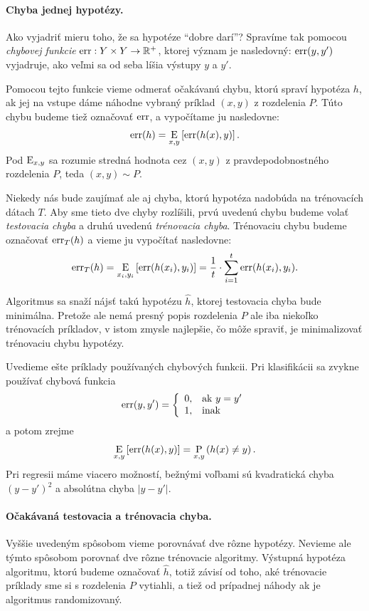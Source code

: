 \paragraph{Chyba jednej hypotézy.}
Ako vyjadriť mieru toho, že sa hypotéze ``dobre darí''? Spravíme tak
pomocou \emph{chybovej funkcie} $\mathrm{err} : Y \times Y \to \mathbb{R}^+$,
ktorej význam je nasledovný: $\mathrm{err}(y, y')$ vyjadruje, ako veľmi
sa od seba líšia výstupy $y$ a $y'$.

Pomocou tejto funkcie vieme odmerať očakávanú chybu, ktorú spraví
hypotéza $h$, ak jej na vstupe dáme náhodne vybraný príklad $(x, y)$
z rozdelenia $P$. Túto chybu budeme tiež označovať $\mathrm{err}$, a vypočítame
ju nasledovne:
$$\mathrm{err}(h) = \operatorname*{\mathrm{E}}_{x, y} \left[ \mathrm{err}(h(x), y) \right].$$
Pod $\operatorname*{\mathrm{E}}_{x, y}$ sa rozumie stredná hodnota cez $(x, y)$
z pravdepodobnostného rozdelenia $P$, teda $(x, y) \sim P$.

Niekedy nás bude zaujímať ale aj chyba, ktorú hypotéza nadobúda na
trénovacích dátach $T$. Aby sme tieto dve chyby rozlíšili, prvú uvedenú
chybu budeme volať \emph{testovacia chyba} a druhú uvedenú
\emph{trénovacia chyba}. Trénovaciu chybu budeme označovať $\mathrm{err}_T(h)$
a vieme ju vypočítať nasledovne:
$$\mathrm{err}_T(h) = \operatorname*{\mathrm{E}}_{x_i, y_i} \left[ \mathrm{err}(h(x_i), y_i) \right] = \frac{1}{t} \cdot \sum_{i=1}^t \mathrm{err}(h(x_i), y_i).$$

Algoritmus sa snaží nájsť takú hypotézu $\hat{h}$, ktorej testovacia
chyba bude minimálna. Pretože ale nemá presný popis rozdelenia $P$ ale
iba niekoľko trénovacích príkladov, v istom zmysle najlepšie, čo môže
spraviť, je minimalizovať trénovaciu chybu hypotézy.

Uvedieme ešte príklady používaných chybových funkcii.
Pri klasifikácii sa zvykne používať chybová funkcia
$$
  \mathrm{err}(y, y') = \left\{
    \begin{array}{ll}
      0, & \text{ak}\ y = y' \\
      1, & \text{inak}
    \end{array}
  \right.
$$
a potom zrejme
$$\operatorname*{\mathrm{E}}_{x, y} \left[ \mathrm{err}(h(x), y) \right] = \operatorname*{\mathrm{P}}_{x, y} \left( h(x) \neq y \right).$$
Pri regresii máme viacero možností, bežnými voľbami sú kvadratická chyba
$(y - y')^2$ a absolútna chyba $|y - y'|$.

\paragraph{Očakávaná testovacia a trénovacia chyba.}
Vyššie uvedeným spôsobom vieme porovnávať dve rôzne hypotézy. Nevieme
ale týmto spôsobom porovnať dve rôzne trénovacie algoritmy. Výstupná
hypotéza algoritmu, ktorú budeme označovať $\hat{h}$, totiž závisí
od toho, aké trénovacie príklady sme si s rozdelenia $P$ vytiahli,
a tiež od prípadnej náhody ak je algoritmus randomizovaný.

